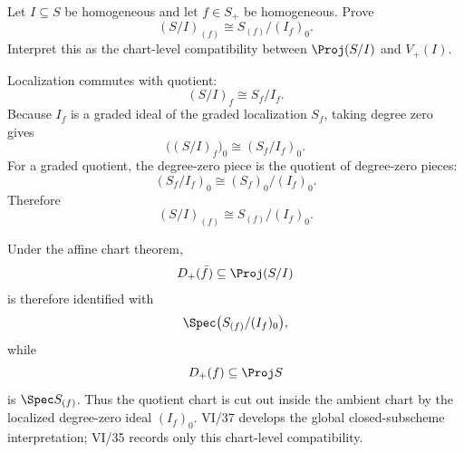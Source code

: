 \begin{problem}\label{prob:vi35-13}
Let \(I\subseteq S\) be homogeneous and let \(f\in S_+\) be homogeneous. Prove
\[
(S/I)_{(f)}
\cong
S_{(f)}/(I_f)_0.
\]
Interpret this as the chart-level compatibility between \(\Proj(S/I)\) and \(V_+(I)\).

\end{problem}

\ifdefined\FullProblemDossiers
\begin{solution}
Localization commutes with quotient:
\[
(S/I)_f
\cong
S_f/I_f.
\]
Because \(I_f\) is a graded ideal of the graded localization \(S_f\), taking degree zero gives
\[
\bigl((S/I)_f\bigr)_0
\cong
(S_f/I_f)_0.
\]
For a graded quotient, the degree-zero piece is the quotient of degree-zero pieces:
\[
(S_f/I_f)_0
\cong
(S_f)_0/(I_f)_0.
\]
Therefore
\[
\boxed{
(S/I)_{(f)}
\cong
S_{(f)}/(I_f)_0.
}
\]

Under the affine chart theorem,
\[
D_+(\bar f)\subseteq\Proj(S/I)
\]
is therefore identified with
\[
\Spec\bigl(S_{(f)}/(I_f)_0\bigr),
\]
while
\[
D_+(f)\subseteq\Proj S
\]
is \(\Spec S_{(f)}\). Thus the quotient chart is cut out inside the ambient chart by the localized degree-zero
ideal \((I_f)_0\). VI/37 develops the global closed-subscheme interpretation; VI/35 records only this chart-level
compatibility.
\end{solution}
\fi
